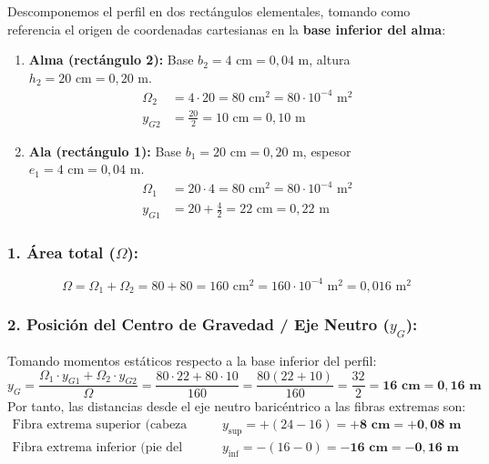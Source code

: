 Descomponemos el perfil en dos rectángulos elementales, tomando como referencia el origen de coordenadas cartesianas en la \textbf{base inferior del alma}:
\begin{enumerate}
    \item \textbf{Alma (rectángulo 2):} Base $b_2 = 4\text{ cm} = 0{,}04\text{ m}$, altura $h_2 = 20\text{ cm} = 0{,}20\text{ m}$.
          \begin{align}
              \Omega_2 & = 4 \cdot 20 = 80\text{ cm}^2 = 80 \cdot 10^{-4}\text{ m}^2 \\[4pt]
              y_{G2}   & = \frac{20}{2} = 10\text{ cm} = 0{,}10\text{ m}
          \end{align}
    \item \textbf{Ala (rectángulo 1):} Base $b_1 = 20\text{ cm} = 0{,}20\text{ m}$, espesor $e_1 = 4\text{ cm} = 0{,}04\text{ m}$.
          \begin{align}
              \Omega_1 & = 20 \cdot 4 = 80\text{ cm}^2 = 80 \cdot 10^{-4}\text{ m}^2 \\[4pt]
              y_{G1}   & = 20 + \frac{4}{2} = 22\text{ cm} = 0{,}22\text{ m}
          \end{align}
\end{enumerate}

\subsubsection*{1. Área total ($\Omega$):}
\begin{equation}
    \Omega = \Omega_1 + \Omega_2 = 80 + 80 = 160\text{ cm}^2 = 160 \cdot 10^{-4}\text{ m}^2 = 0{,}016\text{ m}^2
\end{equation}

\subsubsection*{2. Posición del Centro de Gravedad / Eje Neutro ($y_G$):}
Tomando momentos estáticos respecto a la base inferior del perfil:
\begin{equation}
    y_G = \frac{\Omega_1 \cdot y_{G1} + \Omega_2 \cdot y_{G2}}{\Omega} = \frac{80 \cdot 22 + 80 \cdot 10}{160} = \frac{80(22 + 10)}{160} = \frac{32}{2} = \mathbf{16\text{ cm}} = \mathbf{0{,}16\text{ m}}
\end{equation}
Por tanto, las distancias desde el eje neutro baricéntrico a las fibras extremas son:
\begin{align}
    \text{Fibra extrema superior (cabeza del ala):} & \quad y_{\text{sup}} = +(24 - 16) = \mathbf{+8\text{ cm}} = \mathbf{+0{,}08\text{ m}} \\[4pt]
    \text{Fibra extrema inferior (pie del alma):}   & \quad y_{\text{inf}} = -(16 - 0) = \mathbf{-16\text{ cm}} = \mathbf{-0{,}16\text{ m}}
\end{align}

